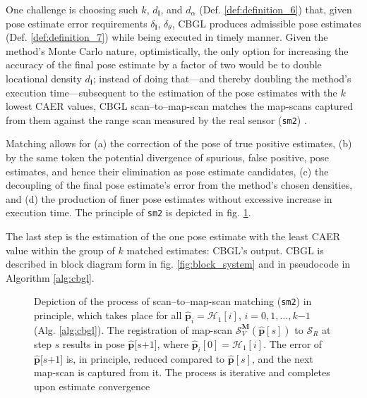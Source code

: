 One challenge is choosing such $k$, $d_{\bm{l}}$, and $d_\alpha$ (Def.
\ref{def:definition_6}) that, given pose estimate error requirements
$\delta_{\bm{l}}$, $\delta_{\theta}$, CBGL produces admissible pose estimates
(Def. \ref{def:definition_7}) while being executed in timely manner.  Given the
method's Monte Carlo nature, optimistically, the only option for increasing the
accuracy of the final pose estimate by a factor of two would be to double
locational density $d_{\bm{l}}$; instead of doing that---and thereby doubling
the method's execution time---subsequent to the estimation of the pose
estimates with the $k$ lowest CAER values, CBGL scan--to--map-scan matches
the map-scans captured from them against the range scan measured by the real
sensor (\texttt{sm2}) \cite{Vasiljevic2016c,Filotheou2023a}.

Matching allows for (a) the correction of the pose of true positive estimates,
(b) by the same token the potential divergence of spurious, false positive,
pose estimates, and hence their elimination as pose estimate candidates, (c)
the decoupling of the final pose estimate's error from the method's chosen
densities, and (d) the production of finer pose estimates without excessive
increase in execution time. The principle of \texttt{sm2} is depicted in fig.
\ref{fig:sm2_evolution}.

The last step is the estimation of the one pose estimate with the least CAER
value within the group of $k$ matched estimates: CBGL's output. CBGL is
described in block diagram form in fig.  \ref{fig:block_system} and in
pseudocode in Algorithm \ref{alg:cbgl}.

\begin{figure}[]\vspace{1.5cm}
  
  \caption{\small Depiction of the process of scan--to--map-scan matching
           (\texttt{sm2}) in principle, which takes place for all
           $\hat{\bm{p}}_i = \mathcal{H}_1[i]$, $i=0,1,\dots,k$$-$$1$ (Alg.
           \ref{alg:cbgl}). The registration of map-scan
           $\mathcal{S}_V^{\bm{M}}(\hat{\bm{p}}[s])$ to $\mathcal{S}_R$ at step
           $s$ results in pose $\hat{\bm{p}}[s$$+$$1]$, where
           $\hat{\bm{p}}_i[0] = \mathcal{H}_1[i]$. The error of
           $\hat{\bm{p}}[s$$+$$1]$ is, in principle, reduced compared to
           $\hat{\bm{p}}[s]$, and the next map-scan is captured from it. The
           process is iterative and completes upon estimate convergence}
  \label{fig:sm2_evolution}
\end{figure}


